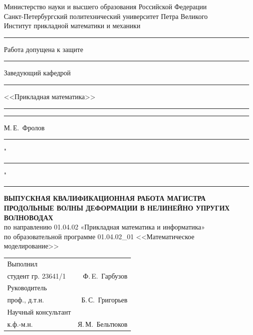 \documentclass[12pt, a4paper]{report}
\begin{document}
\begin{titlepage}
	\begin{center}
		Министерство науки и высшего образования Российской Федерации\\
		Санкт-Петербургский политехнический университет Петра Великого\\
		Институт прикладной математики и механики
	\end{center}
	
	\vspace{5mm}
	
	\begin{flushleft}
		\rule{10cm}{0pt} {Работа допущена к защите}\\
		\rule{10cm}{0pt} Заведующий кафедрой\\
		\rule{10cm}{0pt} <<Прикладная математика>>\\
		\vspace{4mm}
		\rule{10cm}{0pt} \rule{3.6cm}{0.5pt} М.\,Е.~Фролов\\
		\vspace{2mm}
		\rule{10cm}{0pt} "\rule{0.8cm}{0.5pt}" \rule{5.05cm}{0.5pt}
	\end{flushleft}
	
	\vspace{22mm}
	
	\begin{center}
		{\bf ВЫПУСКНАЯ КВАЛИФИКАЦИОННАЯ РАБОТА МАГИСТРА}\\
		\vspace{5mm} 
		{\bf ПРОДОЛЬНЫЕ ВОЛНЫ ДЕФОРМАЦИИ В НЕЛИНЕЙНО УПРУГИХ ВОЛНОВОДАХ}\\
		\vspace{5mm}
		по направлению 01.04.02 «Прикладная математика и информатика»\\
		по образовательной программе 01.04.02\_01 <<Математическое моделирование>>
	\end{center}

	\vspace{20mm}
	\begin{flushleft}
	\begin{tabularx}{\linewidth}{Xr}
		Выполнил & \\
		студент гр. 23641/1 & Ф.\,E.~Гарбузов  \\ 
		\vspace{3mm}
		Руководитель &  \\ 
		проф., д.т.н. & Б.\,С.~Григорьев \\ 
		\vspace{3mm}
		Научный консультант  &  \\ 
		к.ф.-м.н. & Я.\,М.~Бельтюков
	\end{tabularx} 
	\end{flushleft}


\end{titlepage}
\end{document}
